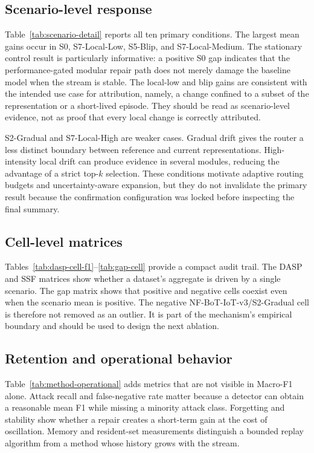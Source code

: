 \subsection{Scenario-level response}
Table~\ref{tab:scenario-detail} reports all ten primary conditions. The largest mean gains occur in S0, S7-Local-Low, S5-Blip, and S7-Local-Medium. The stationary control result is particularly informative: a positive S0 gap indicates that the performance-gated modular repair path does not merely damage the baseline model when the stream is stable. The local-low and blip gains are consistent with the intended use case for attribution, namely, a change confined to a subset of the representation or a short-lived episode. They should be read as scenario-level evidence, not as proof that every local change is correctly attributed.

S2-Gradual and S7-Local-High are weaker cases. Gradual drift gives the router a less distinct boundary between reference and current representations. High-intensity local drift can produce evidence in several modules, reducing the advantage of a strict top-$k$ selection. These conditions motivate adaptive routing budgets and uncertainty-aware expansion, but they do not invalidate the primary result because the confirmation configuration was locked before inspecting the final summary.

\subsection{Cell-level matrices}
Tables~\ref{tab:dasp-cell-f1}--\ref{tab:gap-cell} provide a compact audit trail. The DASP and SSF matrices show whether a dataset's aggregate is driven by a single scenario. The gap matrix shows that positive and negative cells coexist even when the scenario mean is positive. The negative NF-BoT-IoT-v3/S2-Gradual cell is therefore not removed as an outlier. It is part of the mechanism's empirical boundary and should be used to design the next ablation.

\subsection{Retention and operational behavior}
Table~\ref{tab:method-operational} adds metrics that are not visible in Macro-F1 alone. Attack recall and false-negative rate matter because a detector can obtain a reasonable mean F1 while missing a minority attack class. Forgetting and stability show whether a repair creates a short-term gain at the cost of oscillation. Memory and resident-set measurements distinguish a bounded replay algorithm from a method whose history grows with the stream.


